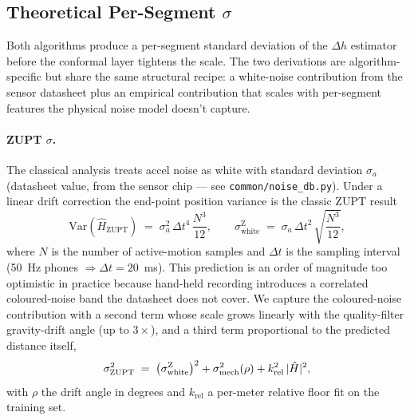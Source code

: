 \subsection{Theoretical Per-Segment $\sigma$}
\label{sec:theoretical-sigma}

Both algorithms produce a per-segment standard deviation of the $\Delta h$
estimator before the conformal layer tightens the scale. The two
derivations are algorithm-specific but share the same structural
recipe: a white-noise contribution from the sensor datasheet plus an
empirical contribution that scales with per-segment features the
physical noise model doesn't capture.

\paragraph{ZUPT $\sigma$.}
The classical analysis treats accel noise as white with standard
deviation $\sigma_a$ (datasheet value, from the sensor chip — see
\texttt{common/noise\_db.py}). Under a linear drift correction the
end-point position variance is the classic ZUPT result
\begin{equation}
  \mathrm{Var}(\hat{H}_\mathrm{ZUPT}) \;=\; \sigma_a^2\,\Delta t^{4}\,\frac{N^3}{12},
  \qquad
  \sigma_\mathrm{white}^{\mathrm{Z}} \;=\; \sigma_a\,\Delta t^{2}\,\sqrt{\frac{N^3}{12}},
  \label{eq:zupt-var}
\end{equation}
where $N$ is the number of active-motion samples and $\Delta t$ is
the sampling interval (50~Hz phones $\Rightarrow \Delta t = 20$~ms).
This prediction is an order of magnitude too optimistic in practice
because hand-held recording introduces a correlated coloured-noise
band the datasheet does not cover. We capture the coloured-noise
contribution with a second term whose scale grows linearly with the
quality-filter gravity-drift angle (up to $3\times$), and a third term
proportional to the predicted distance itself,
\begin{equation}
  \sigma^2_{\rm ZUPT} \;=\;
  \bigl(\sigma_\mathrm{white}^{\mathrm{Z}}\bigr)^2
  + \sigma_\mathrm{mech}^2(\rho)
  + k_\mathrm{rel}^2\,|\hat{H}|^2,
  \label{eq:zupt-sigma-total}
\end{equation}
with $\rho$ the drift angle in degrees and $k_\mathrm{rel}$ a
per-meter relative floor fit on the training set.

